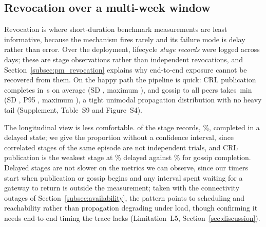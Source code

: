 \documentclass[a4paper,fleqn]{cas-sc}
\begin{document}
\subsection{Revocation over a multi-week window}
\label{subsec:revocation}

Revocation is where short-duration benchmark measurements are least
informative, because the mechanism fires rarely and its failure mode is
delay rather than error.
Over the deployment, \RevEvents{} lifecycle \emph{stage records} were
logged across \RevDays{} days; these are stage observations rather than
independent revocations, and Section~\ref{subsec:pm_revocation} explains
why end-to-end exposure cannot be recovered from them. On the happy path
the pipeline is quick: CRL publication completes in \RevPubMean\,s on
average (SD \RevPubSD, maximum \RevPubMax), and gossip to all peers takes
\RevGossipMean\,min (SD \RevGossipSD, P95 \RevGossipPNinetyFive, maximum
\RevGossipMax), a tight unimodal propagation distribution with no heavy
tail (Supplement, Table~S9 and Figure~S4).

The longitudinal view is less comfortable. \RevDelayed{} of the
\RevEvents{} stage records, \RevDelayedPct\%, completed in a delayed
state; we give the proportion without a confidence interval, since
correlated stages of the same episode are not independent trials, and CRL
publication is the weakest stage at \RevWorstTypePct\% delayed against
\RevBestTypePct\% for gossip completion. Delayed stages are not slower on
the metrics we can observe, since our timers start when publication or
gossip begins and any interval spent waiting for a gateway to return is
outside the measurement; taken with the connectivity outages of
Section~\ref{subsec:availability}, the pattern points to scheduling and
reachability rather than propagation degrading under load, though
confirming it needs end-to-end timing the trace lacks (Limitation~L5,
Section~\ref{sec:discussion}).
\end{document}
